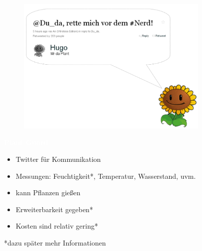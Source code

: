 \documentclass[bigger]{beamer}
\newcommand{\topic}[1]{{\huge{\textcolor{white}{\textbf{#1}}}}}
\begin{document}
{
%
\begin{frame}
\begin{figure}[H]
\includegraphics[width=350px]{SprechblaseOR.png}
\end{figure}

\end{frame}
}

\begin{frame}{\topic{Plant Guard}}
   \begin{itemize}
      \item Twitter für Kommunikation
      \item Messungen: Feuchtigkeit*, Temperatur, Wasserstand, uvm.
      \item kann Pflanzen gießen
      \item Erweiterbarkeit gegeben*
      \item Kosten sind relativ gering*
   \end{itemize}
*dazu später mehr Informationen
\end{frame}
\end{document}
